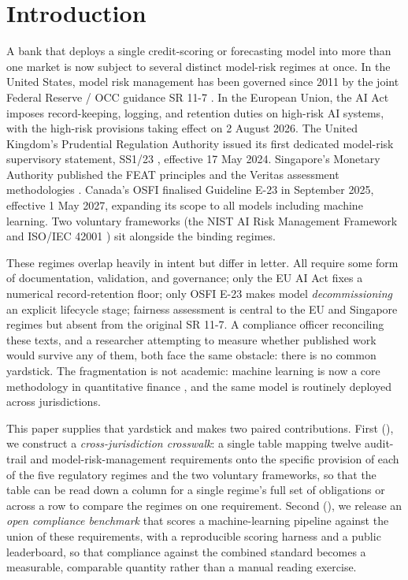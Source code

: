 \section{Introduction}\label{sec:intro}

A bank that deploys a single credit-scoring or forecasting model into more than one market is now subject to several distinct model-risk regimes at once. In the United States, model risk management has been governed since 2011 by the joint Federal Reserve / OCC guidance SR 11-7 \citep{FedSR117, OCC2011}. In the European Union, the AI Act \citep{EUAIAct} imposes record-keeping, logging, and retention duties on high-risk AI systems, with the high-risk provisions taking effect on 2 August 2026. The United Kingdom's Prudential Regulation Authority issued its first dedicated model-risk supervisory statement, SS1/23 \citep{PRASS123}, effective 17 May 2024. Singapore's Monetary Authority published the FEAT principles \citep{MASFEAT} and the Veritas assessment methodologies \citep{MASVeritas}. Canada's OSFI finalised Guideline E-23 \citep{OSFIE23} in September 2025, effective 1 May 2027, expanding its scope to all models including machine learning. Two voluntary frameworks (the NIST AI Risk Management Framework \citep{NIST_AI_100_1} and ISO/IEC 42001 \citep{ISO42001}) sit alongside the binding regimes.

These regimes overlap heavily in intent but differ in letter. All require some form of documentation, validation, and governance; only the EU AI Act fixes a numerical record-retention floor; only OSFI E-23 makes model \emph{decommissioning} an explicit lifecycle stage; fairness assessment is central to the EU and Singapore regimes but absent from the original SR 11-7. A compliance officer reconciling these texts, and a researcher attempting to measure whether published work would survive any of them, both face the same obstacle: there is no common yardstick. The fragmentation is not academic: machine learning is now a core methodology in quantitative finance \citep{GuKellyXiu2020}, and the same model is routinely deployed across jurisdictions.

This paper supplies that yardstick and makes two paired contributions. First (), we construct a \emph{cross-jurisdiction crosswalk}: a single table mapping twelve audit-trail and model-risk-management requirements onto the specific provision of each of the five regulatory regimes and the two voluntary frameworks, so that the table can be read down a column for a single regime's full set of obligations or across a row to compare the regimes on one requirement. Second (), we release an \emph{open compliance benchmark} that scores a machine-learning pipeline against the union of these requirements, with a reproducible scoring harness and a public leaderboard, so that compliance against the combined standard becomes a measurable, comparable quantity rather than a manual reading exercise.


